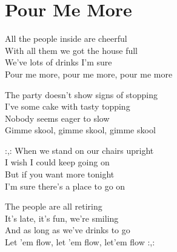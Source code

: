 \section{Pour Me More}

All the people inside are cheerful\\
With all them we got the house full\\
We've lots of drinks I'm sure\\
Pour me more, pour me more, pour me more


The party doesn't show signs of stopping\\
I've some cake with tasty topping\\
Nobody seems eager to slow\\
Gimme skool, gimme skool, gimme skool


:,: When we stand on our chairs upright\\
I wish I could keep going on\\
But if you want more tonight\\
I'm sure there's a place to go on


The people are all retiring\\
It's late, it's fun, we're smiling\\
And as long as we've drinks to go\\
Let 'em flow, let 'em flow, let'em flow :,: